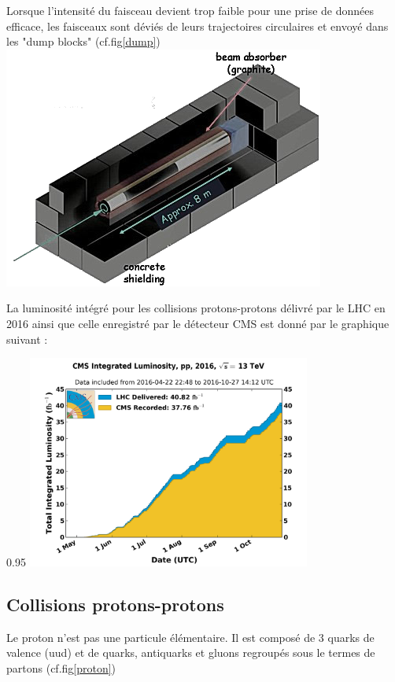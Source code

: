 Lorsque l'intensité du faisceau devient trop faible pour une prise de données efficace, les faisceaux sont déviés de leurs trajectoires circulaires et envoyé dans les "dump blocks" (cf.fig\ref{dump})
\marginpar
{
	\includegraphics[width=\marginparwidth]{LHC/dump.png}
    	\label{dump}
}

La luminosité intégré pour les collisions protons-protons délivré par le LHC en 2016 ainsi que celle enregistré par  le détecteur CMS est donné par le graphique suivant :
\begin{minipagewithmarginpars}[h]{0.95\textwidth}
\centering
\includegraphics[width=0.7\textwidth]{LHC/luminosity.png}
\end{minipagewithmarginpars}

\subsection{Collisions protons-protons}
Le proton n'est pas une particule élémentaire. Il est composé de 3 quarks de valence (uud) et de quarks, antiquarks et gluons regroupés sous le termes de partons (cf.fig\ref{proton})

